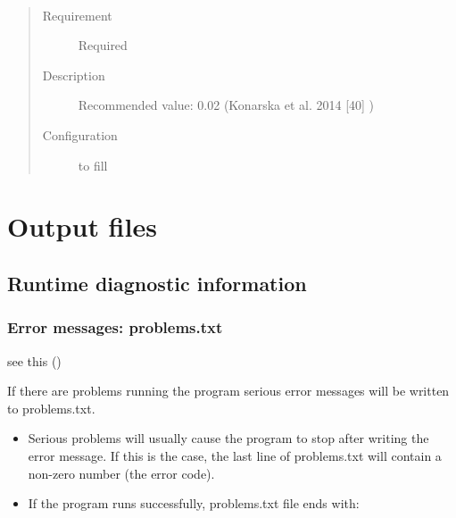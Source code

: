 \documentclass[letterpaper,10pt,english]{sphinxmanual}
\begin{document}
\begin{fulllineitems}
\label{\detokenize{input_files/SOLWEIG_input/SOLWEIGinput:cmdoption-arg-transmin}}~\begin{quote}\begin{description}
\item[{Requirement}] \leavevmode
Required

\item[{Description}] \leavevmode
Recommended value: 0.02 (Konarska et al. 2014 {[}40{]} )

\item[{Configuration}] \leavevmode
to fill

\end{description}\end{quote}

\end{fulllineitems}



\chapter{Output files}
\label{\detokenize{output_files/output_files:output-files}}\label{\detokenize{output_files/output_files::doc}}\label{\detokenize{output_files/output_files:id1}}

\section{Runtime diagnostic information}
\label{\detokenize{output_files/output_files:runtime-diagnostic-information}}

\subsection{Error messages: problems.txt}
\label{\detokenize{output_files/output_files:error-messages-problems-txt}}
see this {\hyperref[\detokenize{output_files/output_files:output-files}]{}} ()

If there are problems running the program serious error messages will be
written to problems.txt.
\begin{itemize}
\item {} 
Serious problems will usually cause the program to stop after writing
the error message. If this is the case, the last line of problems.txt
will contain a non-zero number (the error code).

\item {} 
If the program runs successfully, problems.txt file ends with:

%
\begin{sphinxVerbatim}[commandchars=\\\{\}]
 
\end{sphinxVerbatim}

\end{itemize}
\end{document}
